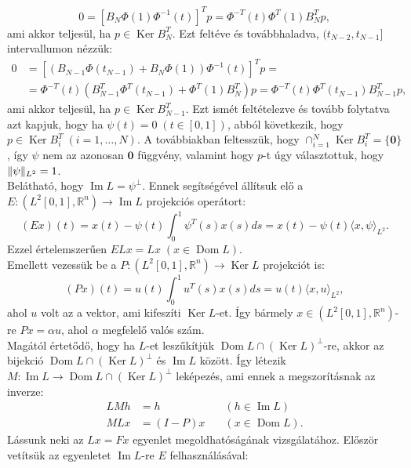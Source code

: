 \documentclass[oneside, titlepage, 12pt, a4paper]{report}
\DeclareMathOperator{\Ima}{Im}	%
\DeclareMathOperator{\Ker}{Ker}	%
\DeclareMathOperator{\Dom}{Dom}	%
\DeclarePairedDelimiter\norm{\lVert}{\rVert}	%
\begin{document}
\begin{equation*}
0 = \left[ B_N \Phi(1) \Phi^{-1}(t) \right]^T p = \Phi^{-T}(t) \Phi^T(1) B_N^T p,
\end{equation*}
ami akkor teljesül, ha $p \in \Ker B_N^T$. Ezt feltéve és továbbhaladva, $(t_{N-2}, t_{N-1}]$ intervallumon nézzük:
\begin{align*}
0 &= \left[ \left( B_{N-1} \Phi(t_{N-1}) + B_N \Phi(1) \right) \Phi^{-1}(t) \right]^T p =\\
 &= \Phi^{-T}(t) \left( B_{N-1}^T \Phi^T(t_{N-1}) + \Phi^T(1) B_N^T \right) p = \Phi^{-T}(t) \Phi^T(t_{N-1}) B_{N-1}^T p,
\end{align*}
ami akkor teljesül, ha $p \in \Ker B_{N-1}^T$. Ezt ismét feltételezve és tovább folytatva azt kapjuk, hogy ha $\psi(t) = 0 \; (t \in [0, 1])$, abból következik, hogy $p \in \Ker B_i^T \; (i = 1, \dots, N)$. A továbbiakban feltesszük, hogy $\cap_{i = 1}^N \Ker B_i^T = \{ \mathbf{0} \}$, így $\psi$ nem az azonosan $\mathbf{0}$ függvény, valamint hogy $p$-t úgy választottuk, hogy $\norm{\psi}_{L^2} = 1$. \\
Belátható, hogy $\Ima L = {\psi}^\perp$. %
Ennek segítségével állítsuk elő a $E : ( L^2[0, 1], \mathbb{R}^n) \rightarrow \Ima L$ projekciós operátort:
\begin{equation*}
(Ex) (t) = x(t) - \psi(t) \int_0^1 \psi^T(s) x(s) ds = x(t) - \psi(t) \langle x, \psi \rangle_{L^2}.
\end{equation*}
Ezzel értelemszerűen $E L x = L x \; (x \in \Dom L)$. \\
Emellett vezessük be a $P : ( L^2[0, 1], \mathbb{R}^n) \rightarrow \Ker L$ projekciót is:
\begin{equation*}
(Px)(t) = u(t) \int_0^1 u^T(s) x(s) ds = u(t) \langle x, u \rangle_{L^2},
\end{equation*}
ahol $u$ volt az a vektor, ami kifeszíti $\Ker L$-et. Így bármely $x \in ( L^2[0, 1], \mathbb{R}^n)$-re $Px = \alpha u$, ahol $\alpha$ megfelelő valós szám. \\
Magától értetődő, hogy ha $L$-et leszűkítjük $\Dom L \cap (\Ker L)^\perp$-re, akkor az bijekció $\Dom L \cap (\Ker L)^\perp$ és $\Ima L$ között. Így létezik $M : \Ima L \rightarrow \Dom L \cap (\Ker L)^\perp$ leképezés, ami ennek a megszorításnak az inverze:
\begin{align*}
L M h &= h \quad &(h \in \Ima L) \\
M L x &= (I - P) x \quad &(x \in \Dom L).
\end{align*}
Lássunk neki az $Lx = Fx$ egyenlet megoldhatóságának vizsgálatához. Először vetítsük az egyenletet $\Ima L$-re $E$ felhasználásával:
\end{document}
